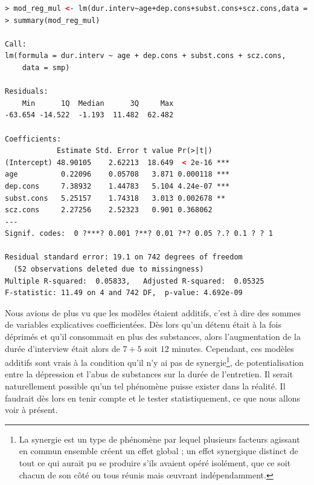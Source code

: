 \begin{lstlisting}[language=html]
> mod_reg_mul <- lm(dur.interv~age+dep.cons+subst.cons+scz.cons,data = smp)
> summary(mod_reg_mul)

Call:
lm(formula = dur.interv ~ age + dep.cons + subst.cons + scz.cons, 
    data = smp)

Residuals:
    Min      1Q  Median      3Q     Max 
-63.654 -14.522  -1.193  11.482  62.482 

Coefficients:
            Estimate Std. Error t value Pr(>|t|)    
(Intercept) 48.90105    2.62213  18.649  < 2e-16 ***
age          0.22096    0.05708   3.871 0.000118 ***
dep.cons     7.38932    1.44783   5.104 4.24e-07 ***
subst.cons   5.25157    1.74318   3.013 0.002678 ** 
scz.cons     2.27256    2.52323   0.901 0.368062    
---
Signif. codes:  0 ?***? 0.001 ?**? 0.01 ?*? 0.05 ?.? 0.1 ? ? 1

Residual standard error: 19.1 on 742 degrees of freedom
  (52 observations deleted due to missingness)
Multiple R-squared:  0.05833,	Adjusted R-squared:  0.05325 
F-statistic: 11.49 on 4 and 742 DF,  p-value: 4.692e-09
\end{lstlisting}

Nous avions de plus vu que les modèles étaient additifs, c'est à dire des sommes de variables explicatives coefficientées. Dès lors qu'un détenu était à la fois déprimés et qu'il consommait en plus des substances, alors l'augmentation de la durée d'interview était alors de $7 + 5$ soit $12$ minutes. \newline
Cependant, ces modèles additifs sont vrais à la condition qu'il n'y ai pas de synergie\footnote{La synergie est un type de phénomène par lequel plusieurs facteurs agissant en commun ensemble créent un effet global ; un effet synergique distinct de tout ce qui aurait pu se produire s'ils avaient opéré isolément, que ce soit chacun de son côté ou tous réunis mais œuvrant indépendamment.}, de potentialisation entre la dépression et l'abus de substances sur la durée de l'entretien.\newline
Il serait naturellement possible qu'un tel phénomène puisse exister dans la réalité. Il faudrait dès lors en tenir compte et le tester statistiquement, ce que nous allons voir à présent.


